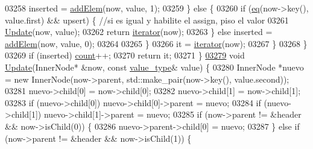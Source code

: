 \begin{DoxyCode}
03258                         inserted = \hyperlink{classaed2_1_1map_a010a17bb041f4b1dfc22246920cde9ee_a010a17bb041f4b1dfc22246920cde9ee}{addElem}(now, value, 1);
03259                     \} \textcolor{keywordflow}{else} \{
03260                         \textcolor{keywordflow}{if} (\hyperlink{classaed2_1_1map_ab45cb28bb215cd229383d88b96b3f624_ab45cb28bb215cd229383d88b96b3f624}{eq}(now->key(), value.first) && upsert) \{ \textcolor{comment}{//si es igual y habilite el assign,
       piso el valor}
03261                             \hyperlink{classaed2_1_1map_ad56871b0800aa1ba7df2eef904a35743_ad56871b0800aa1ba7df2eef904a35743}{Update}(now, value);
03262                             \textcolor{keywordflow}{return} \hyperlink{classaed2_1_1map_1_1iterator_acdd790eb54216601a2e0591776004dba_acdd790eb54216601a2e0591776004dba}{iterator}(now);
03263                         \} \textcolor{keywordflow}{else} inserted = \hyperlink{classaed2_1_1map_a010a17bb041f4b1dfc22246920cde9ee_a010a17bb041f4b1dfc22246920cde9ee}{addElem}(now, value, 0);
03264 
03265                     \}
03266                     it = \hyperlink{classaed2_1_1map_1_1iterator_acdd790eb54216601a2e0591776004dba_acdd790eb54216601a2e0591776004dba}{iterator}(now);
03267                 \}
03268             \}
03269             \textcolor{keywordflow}{if} (inserted) \hyperlink{classaed2_1_1map_a44236c4f16cdc20a10759862b198bde4_a44236c4f16cdc20a10759862b198bde4}{count}++;
03270             \textcolor{keywordflow}{return} it;
03271         \}
\hypertarget{map_8h_source.tex_l03279}{}\hyperlink{classaed2_1_1map_ad56871b0800aa1ba7df2eef904a35743_ad56871b0800aa1ba7df2eef904a35743}{03279}         \textcolor{keywordtype}{void} \hyperlink{classaed2_1_1map_ad56871b0800aa1ba7df2eef904a35743_ad56871b0800aa1ba7df2eef904a35743}{Update}(InnerNode* &now, \textcolor{keyword}{const} \hyperlink{classaed2_1_1map_a719db98e0ff9a837610f76be33264680_a719db98e0ff9a837610f76be33264680}{value\_type}& value) \{
03280             InnerNode *nuevo = \textcolor{keyword}{new} InnerNode(now->parent, std::make\_pair(now->key(), value.second));
03281             nuevo->child[0] = now->child[0];
03282             nuevo->child[1] = now->child[1];
03283             \textcolor{keywordflow}{if} (nuevo->child[0]) nuevo->child[0]->parent = nuevo;
03284             \textcolor{keywordflow}{if} (nuevo->child[1]) nuevo->child[1]->parent = nuevo;
03285             \textcolor{keywordflow}{if} (now->parent != &header && now->isChild(0)) \{
03286                 nuevo->parent->child[0] = nuevo;
03287             \} \textcolor{keywordflow}{else} \textcolor{keywordflow}{if} (now->parent != &header && now->isChild(1)) \{

\end{DoxyCode}
